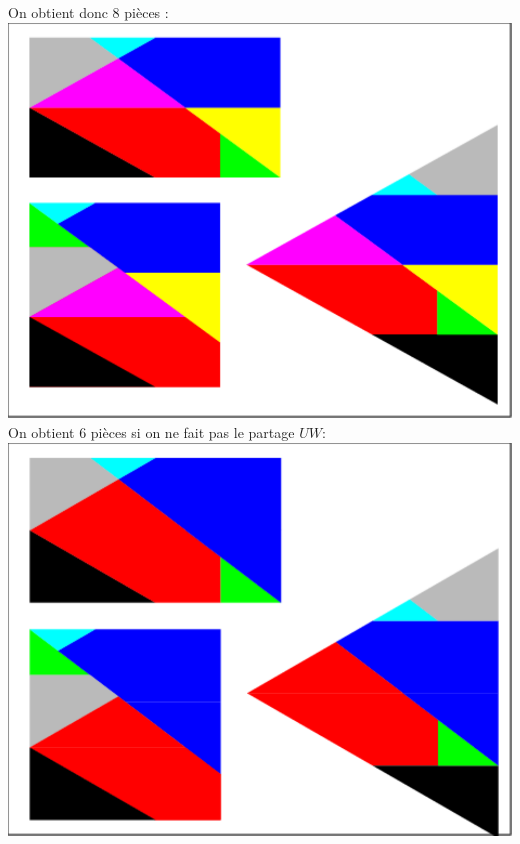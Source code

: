 \documentclass[a4paper,11pt]{book}
\begin{document}
On obtient donc 8 pi\`eces :\\
\includegraphics[width=\textwidth]{puzzleca1}
On obtient 6 pi\`eces si on ne fait pas le partage $UW$:\\
\includegraphics[width=\textwidth]{puzzleca2}
\end{document}
